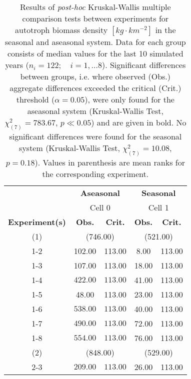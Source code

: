 \begin{table}[ht]
\centering
\small
\caption[Kruskal-Wallis multiple comparison of autotroph biomass density.]{Results of \textit{post-hoc} Kruskal-Wallis multiple comparison 
                tests between experiments for autotroph biomass density $[kg\cdot km^{-2}]$ in the seasonal and aseasonal system. 
                  Data for each group consists of median values for the last 10 simulated years ($n_{i} = 122; \quad i = 1,\ldots8$). 
                  Significant differences between groups, i.e. where observed (Obs.) aggregate differences exceeded the critical (Crit.) threshold ($\alpha = 0.05$), were only found for the aseasonal system (Kruskal-Wallis Test, $\chi^{2}_{(7)} = 783.67$, $p \ll 0.05$) and are given in bold. No significant differences were found for the seasonal system (Kruskal-Wallis Test, $\chi^{2}_{(7)} = 10.08$, $p = 0.18$). Values in parenthesis are mean ranks for the corresponding experiment.} 
\label{tab:chap:res:dyn:autoBMD}
\begin{tabular*}{\textwidth}{@{\extracolsep{\fill} }ccccc}
  \toprule
& \multicolumn{2}{c}{\textbf{Aseasonal}} & \multicolumn{2}{c}{\textbf{Seasonal}} \\
& \multicolumn{2}{c}{Cell 0} & \multicolumn{2}{c}{Cell 1} \\
\cmidrule(lr){2-3} \cmidrule(lr){4-5}
\textbf{Experiment(s)} & \textbf{Obs.} & \textbf{Crit.} & \textbf{Obs.} & \textbf{Crit.} \\ 
  \midrule
  (1) & \multicolumn{2}{c}{(746.00)} & \multicolumn{2}{c}{(521.00)} \\ 
1-2 & 102.00 & 113.00 & 8.00 & 113.00 \\ 
  1-3 & 107.00 & 113.00 & 18.00 & 113.00 \\ 
  1-4 & \(\mathbf{422.00}\) & \(\mathbf{113.00}\) & 41.00 & 113.00 \\ 
  1-5 & 48.00 & 113.00 & 23.00 & 113.00 \\ 
  1-6 & \(\mathbf{538.00}\) & \(\mathbf{113.00}\) & 40.00 & 113.00 \\ 
  1-7 & \(\mathbf{490.00}\) & \(\mathbf{113.00}\) & 72.00 & 113.00 \\ 
  1-8 & \(\mathbf{554.00}\) & \(\mathbf{113.00}\) & 76.00 & 113.00 \\ [1ex]
  (2) & \multicolumn{2}{c}{(848.00)} & \multicolumn{2}{c}{(529.00)} \\
   2-3 & \(\mathbf{209.00}\) & \(\mathbf{113.00}\) & 26.00 & 113.00 \\ 

\end{tabular*}
\end{table}
